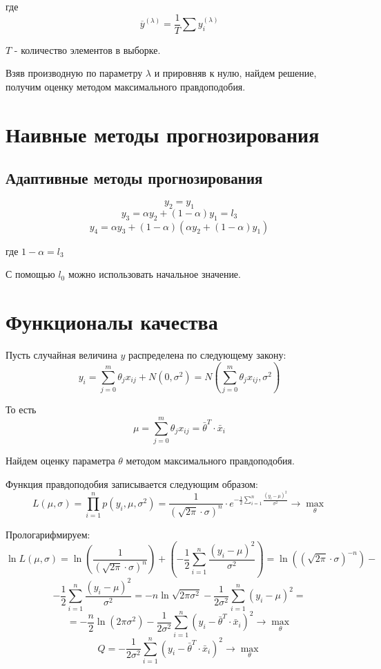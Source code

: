 \documentclass[aps,%
12pt,%
final,%
oneside,
onecolumn,%
musixtex, %
superscriptaddress,%
centertags]{article} %
\begin{document}
где $$\overline{y}^{(\lambda)} = \frac{1}{T} \sum y_i^{(\lambda)} $$

$ T $ - количество элементов в выборке.


Взяв производную по параметру $\lambda$ и прировняв к нулю, найдем решение, получим оценку методом максимального правдоподобия.
\section{Наивные методы прогнозирования}
\subsection{Адаптивные методы прогнозирования}
$$ y_2 = y_1$$
$$y_3 = \alpha y_2+(1-\alpha)y_1 = l_3$$
$$y_4 = \alpha y_3 + (1-\alpha)(\alpha y_2 + (1-\alpha)y_1) $$

где $1-\alpha=l_3$

С помощью $l_0$ можно использовать начальное значение. 

\section{Функционалы качества}

Пусть случайная величина $y$ распределена по следующему закону:
$$y_i = \sum_{j=0}^m \theta_j x_{ij}+ N(0,\sigma^2) = N(\sum_{j=0}^m \theta_j x_{ij},\sigma^2)$$

То есть $$\mu  = \sum_{j=0}^m \theta_j x_{ij} = \left .\bar{\theta}\right .^T \cdot \bar{x}_i $$

Найдем оценку параметра $\theta$ методом максимального правдоподобия.

Функция правдоподобия записывается следующим образом:
$$L(\mu,\sigma) = \prod_{i=1}^n p(y_i,\mu,\sigma^2) = \frac{1}{(\sqrt{2\pi}\cdot \sigma)^n} \cdot e^{-\frac{1}{2}\sum\limits_{i=1}^n \frac{(y_i - \mu)^2}{\sigma^2}} \to \underset{\theta}{\max}$$

Прологарифмируем:
$$\ln L(\mu,\sigma) = \ln \left(\frac{1}{(\sqrt{2\pi}\cdot \sigma)^n}\right) + \left(-\frac{1}{2}\sum\limits_{i=1}^n \frac{(y_i - \mu)^2}{\sigma^2}\right)  =  \ln \left((\sqrt{2\pi}\cdot \sigma)^{-n}\right) -$$
$$ -\frac{1}{2}\sum\limits_{i=1}^n \frac{(y_i - \mu)^2}{\sigma^2}  = -n \ln \sqrt{2\pi\sigma^2} - \frac{1}{2\sigma^2}\sum\limits_{i=1}^n (y_i - \mu)^2  = $$
$$ = -\frac{n}{2} \ln (2\pi\sigma^2) -\frac{1}{2\sigma^2}\sum\limits_{i=1}^n (y_i -  \left .\bar{\theta}\right .^T \cdot \bar{x}_i)^2  \to \underset{\theta}{\max} $$
$$Q = - \frac{1}{2\sigma^2}\sum\limits_{i=1}^n (y_i -  \left .\bar{\theta}\right .^T \cdot \bar{x}_i)^2  \to \underset{\theta}{\max}$$
\end{document}
